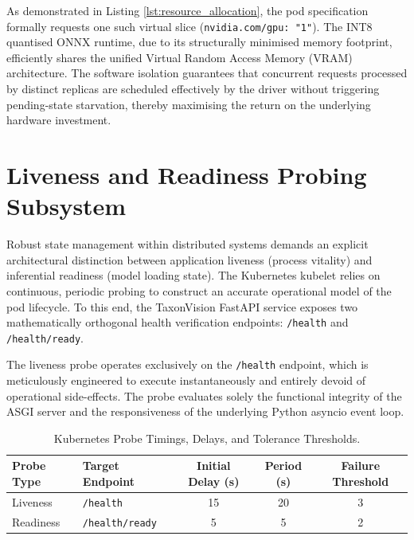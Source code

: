 As demonstrated in Listing \ref{lst:resource_allocation}, the pod specification formally requests one such virtual slice (\texttt{nvidia.com/gpu: "1"}). The INT8 quantised ONNX runtime, due to its structurally minimised memory footprint, efficiently shares the unified Virtual Random Access Memory (VRAM) architecture. The software isolation guarantees that concurrent requests processed by distinct replicas are scheduled effectively by the driver without triggering pending-state starvation, thereby maximising the return on the underlying hardware investment.

\section{Liveness and Readiness Probing Subsystem}
\label{sec:health_probes_subsystem}

Robust state management within distributed systems demands an explicit architectural distinction between application liveness (process vitality) and inferential readiness (model loading state). The Kubernetes kubelet relies on continuous, periodic probing to construct an accurate operational model of the pod lifecycle. To this end, the TaxonVision FastAPI service exposes two mathematically orthogonal health verification endpoints: \texttt{/health} and \texttt{/health/ready}.

The liveness probe operates exclusively on the \texttt{/health} endpoint, which is meticulously engineered to execute instantaneously and entirely devoid of operational side-effects. The probe evaluates solely the functional integrity of the ASGI server and the responsiveness of the underlying Python asyncio event loop.

\begin{table}[htbp]
\centering
\caption{Kubernetes Probe Timings, Delays, and Tolerance Thresholds.}
\label{tab:probe_timings}
\begin{tabular}{@{}llccc@{}}
\toprule
\textbf{Probe Type} & \textbf{Target Endpoint} & \textbf{Initial Delay (s)} & \textbf{Period (s)} & \textbf{Failure Threshold} \\ \midrule
Liveness & \texttt{/health} & 15 & 20 & 3 \\
Readiness & \texttt{/health/ready} & 5 & 5 & 2 \\ \bottomrule
\end{tabular}
\end{table}

